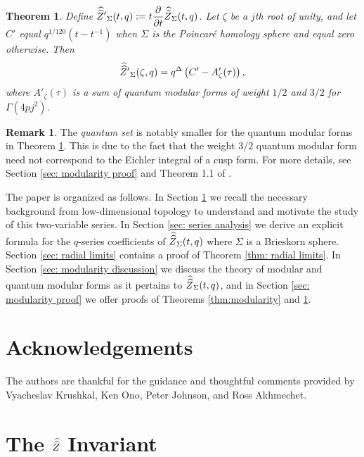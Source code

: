 \documentclass[11pt,letterpaper]{amsart}
\newtheorem{theorem}{Theorem}[section]
\theoremstyle{definition}
\newtheorem*{remark}{Remark}
\theoremstyle{plain}
\newcommand{\Zhathat}{\widehat{\vphantom{\rule{5pt}{10pt}}\smash{\widehat{Z}}\,}\!}
\numberwithin{equation}{section}
\theoremstyle{example}
\begin{document}
\begin{theorem}\label{thm:diffmodular} Define $\displaystyle{{\Zhathat'}_{\Sigma}(t, q):= t \frac{\partial}{\partial t} {\Zhathat}_{\Sigma}(t, q)}$. Let $\zeta$ be a $j$th root of unity, and let $C'$ equal $q^{1/120}(t-t^{-1})$ when $\Sigma$ is the Poincar\'e homology sphere and equal zero otherwise. Then \[{\Zhathat'}_{\Sigma}(\zeta, q)= q^\Delta\left(C' - A'_\zeta(\tau)\right), \] where $A'_\zeta(\tau)$ is a sum of quantum modular forms of weight $1/2$ and $3/2$ for $\Gamma(4pj^2)$. 
\end{theorem}
\begin{remark}
The \textit{quantum set} is notably smaller for the quantum modular forms in Theorem \ref{thm:diffmodular}. This is due to the fact that the weight $3/2$ quantum modular form need not correspond to the Eichler integral of a cusp form. For more details, see Section \ref{sec: modularity proof} and Theorem 1.1 of \cite{goswamiosburn}.
\end{remark}

The paper is organized as follows. In Section \ref{sec: lattice cohomology} we recall the necessary background from low-dimensional topology to understand and motivate the study of this two-variable series. In Section \ref{sec: series analysis} we derive an explicit formula for the $q$-series coefficients of $\Zhathat_{\Sigma}(t,q)$ where $\Sigma$ is a Brieskorn sphere. Section \ref{sec: radial limits} contains a proof of Theorem \ref{thm: radial limits}. In Section \ref{sec: modularity discussion} we discuss the theory of modular and quantum modular forms as it pertains to $\Zhathat_{\Sigma}(t,q)$, and in Section \ref{sec: modularity proof} we offer proofs of Theorems \ref{thm:modularity} and \ref{thm:diffmodular}.

\section*{Acknowledgements}
The authors are thankful for the guidance and thoughtful comments provided by Vyacheslav Krushkal, Ken Ono, Peter Johnson, and Ross Akhmechet.

\section{The $\Zhathat$ Invariant}\label{sec: lattice cohomology}
\end{document}

